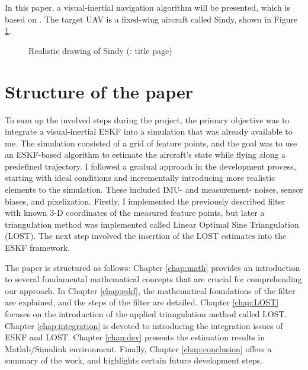 In this paper, a visual-inertial navigation algorithm will be presented, which is based on \cite{rel-nav}. The target UAV is a fixed-wing aircraft called Sindy, shown in Figure \ref{fig:sindy}.
\begin{figure}[!ht]
    \centering
    
    \caption{Realistic drawing of Sindy (\cite{sindy-manual}: title page)}
    \label{fig:sindy}
\end{figure}

\section{Structure of the paper}

To sum up the involved steps during the project, the primary objective was to integrate a visual-inertial ESKF into a simulation that was already available to me. The simulation consisted of a grid of feature points, and the goal was to use an ESKF-based algorithm to estimate the aircraft's state while flying along a predefined trajectory. I followed a gradual approach in the development process, starting with ideal conditions and incrementally introducing more realistic elements to the simulation. These included IMU- and measurement- noises, sensor biases, and pixelization. Firstly, I implemented the previously described filter with known 3-D coordinates of the measured feature points, but later a triangulation method was implemented called Linear Optimal Sine Triangulation (LOST). The next step involved the insertion of the LOST estimates into the ESKF framework. 

The paper is structured as follows: Chapter \ref{chap:math} provides an introduction to several fundamental mathematical concepts that are crucial for comprehending our approach. In Chapter \ref{chap:eskf}, the mathematical foundations of the filter are explained, and the steps of the filter are detailed. Chapter \ref{chap:LOST} focuses on the introduction of the applied triangulation method called LOST. Chapter \ref{chap:integration} is devoted to introducing the integration issues of ESKF and LOST. Chapter \ref{chap:dev} presents the estimation results in Matlab/Simulink environment. Finally, Chapter \ref{chap:conclusion} offers a summary of the work, and highlights certain future development steps.
